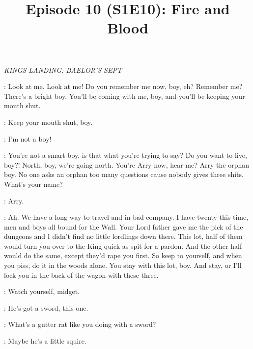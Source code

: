 

\title{Episode 10 (S1E10): Fire and Blood}
\author{}
\date{}
\maketitle




\scene

\textit{KINGS LANDING: BAELOR'S SEPT}


\YOREN: Look at me. Look at me! Do you remember me now, boy, eh? Remember me? There's a bright boy. You'll be coming with me, boy, and you'll be keeping your mouth shut. 


\YOREN: Keep your mouth shut, boy. 

\ARYA: I'm not a boy! 

\YOREN: You're not a smart boy, is that what you're trying to say? Do you want to live, boy?! North, boy, we're going north.  You're Arry now, hear me? Arry the orphan boy. No one asks an orphan too many questions cause nobody gives three shits. What's your name? 

\ARYA: Arry. 


\YOREN: Ah. We have a long way to travel and in bad company. I have twenty this time, men and boys all bound for the Wall. Your Lord father gave me the pick of the dungeons and I didn't find no little lordlings down there. This lot, half of them would turn you over to the King quick as spit for a pardon. And the other half would do the same, except they'd rape you first. So keep to yourself, and when you piss, do it in the woods alone. You stay with this lot, boy. And stay, or I'll lock you in the back of the wagon with these three. 

\HOTPIE: Watch yourself, midget. 

\LOMMY: He's got a sword, this one. 

\HOTPIE: What's a gutter rat like you doing with a sword? 

\LOMMY: Maybe he's a little squire. 


